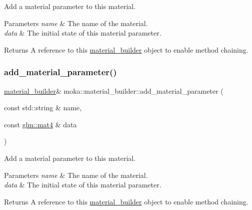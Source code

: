 Add a material parameter to this material. 


\begin{DoxyParams}{Parameters}
{\em name} & The name of the material. \\
\hline
{\em data} & The initial state of this material parameter. \\
\hline
\end{DoxyParams}
\begin{DoxyReturn}{Returns}
A reference to this \mbox{\hyperlink{classmoka_1_1material__builder}{material\+\_\+builder}} object to enable method chaining. 
\end{DoxyReturn}
\mbox{\label{classmoka_1_1material__builder_a0a7d0c5314739e8cfdc4bc12e237e568}} 
\subsubsection{\texorpdfstring{add\_material\_parameter()}{add\_material\_parameter()}\hspace{0.1cm}{\footnotesize\ttfamily [7/7]}}
{\footnotesize\ttfamily \mbox{\hyperlink{classmoka_1_1material__builder}{material\+\_\+builder}}\& moka\+::material\+\_\+builder\+::add\+\_\+material\+\_\+parameter (\begin{DoxyParamCaption}\item[{const std\+::string \&}]{name,  }\item[{const \mbox{\hyperlink{namespacemoka_aed2224bc0e5b79e57a8975ded94ee1aaabe14b41eb96410ea28b32bc138d885ae}{glm\+::mat4}} \&}]{data }\end{DoxyParamCaption})}



Add a material parameter to this material. 


\begin{DoxyParams}{Parameters}
{\em name} & The name of the material. \\
\hline
{\em data} & The initial state of this material parameter. \\
\hline
\end{DoxyParams}
\begin{DoxyReturn}{Returns}
A reference to this \mbox{\hyperlink{classmoka_1_1material__builder}{material\+\_\+builder}} object to enable method chaining. 
\end{DoxyReturn}
\mbox{\label{classmoka_1_1material__builder_abb53367df5be8f441a886462075713c5}} 
